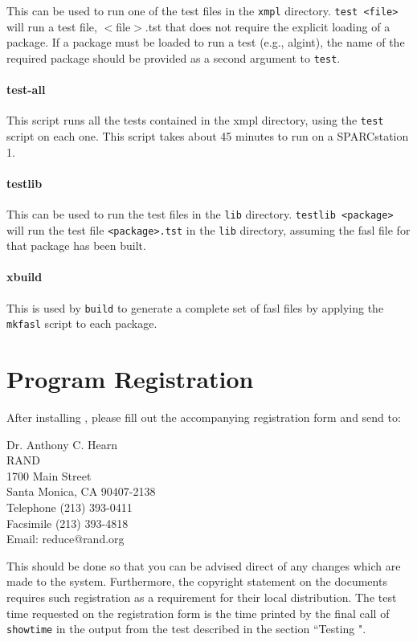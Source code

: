 This can be used to run one of the test files in the {\tt xmpl} directory.
{\tt  test <file>} will run a test file, $<$file$>$.tst that does
not require the explicit loading of a package.
If a package must be loaded to run a test (e.g., algint), the name of
the required package should be provided as a second argument to {\tt test}.

\paragraph{test-all}

This script runs all the tests contained in the xmpl directory, using the
{\tt test} script on each one.  This script takes about 45 minutes to run
on a SPARCstation 1.

\paragraph{testlib}

This can be used to run the test files in the {\tt lib} directory.
{\tt  testlib <package>} will run the test file {\tt <package>.tst} in the
{\tt lib} directory, assuming the fasl file for that package has been built.

\paragraph{xbuild}

This is used by {\tt build} to generate a complete set of fasl files by
applying the {\tt mkfasl} script to each package.

\section{Program Registration}
After installing {\REDUCE}, please fill out the accompanying registration
form and send to:
\begin{center}
Dr. Anthony C. Hearn \\
RAND \\
1700 Main Street \\
Santa Monica, CA 90407-2138 \\
Telephone (213) 393-0411 \\
Facsimile (213) 393-4818 \\
Email: reduce@rand.org
\end{center}

This should be done so that you can be advised direct of any changes which
are made to the system.  Furthermore, the copyright statement on the
{\REDUCE} documents requires such registration as a requirement for their
local distribution.  The test time requested on the registration form is
the time printed by the final call of {\tt showtime} in the output from
the test described in the section ``Testing {\REDUCE}".

